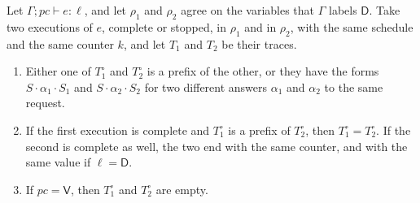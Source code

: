 \documentclass[acmsmall,nonacm,screen]{acmart}
\newcommand{\D}{\mathsf{D}}
\newcommand{\Vl}{\mathsf{V}}
\newcommand{\rqt}[1]{#1^{\circ}}
\begin{document}
\begin{lemma}
\label{lem:durable}
Let $\Gamma; pc \vdash e : \ell$, and let $\rho_1$ and $\rho_2$ agree on the variables that
$\Gamma$ labels $\D$. Take two executions of $e$, complete or stopped, in $\rho_1$ and in
$\rho_2$, with the same schedule and the same counter $k$, and let $T_1$ and $T_2$ be their
traces.
\begin{enumerate}
\item Either one of $\rqt{T_1}$ and $\rqt{T_2}$ is a prefix of the other, or they have the forms
  $S \cdot \alpha_1 \cdot S_1$ and $S \cdot \alpha_2 \cdot S_2$ for two different answers
  $\alpha_1$ and $\alpha_2$ to the same request.
\item If the first execution is complete and $\rqt{T_1}$ is a prefix of $\rqt{T_2}$, then
  $\rqt{T_1} = \rqt{T_2}$. If the second is complete as well, the two end with the same counter,
  and with the same value if $\ell = \D$.
\item If $pc = \Vl$, then $\rqt{T_1}$ and $\rqt{T_2}$ are empty.
\end{enumerate}
\end{lemma}
\end{document}
